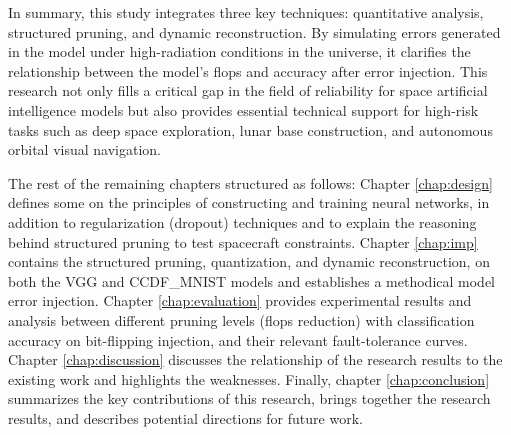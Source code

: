 In summary, this study integrates three key techniques: quantitative analysis, structured pruning, and dynamic reconstruction. By simulating errors generated in the model under high-radiation conditions in the universe, it clarifies the relationship between the model's \gls{flops} and accuracy after error injection. This research not only fills a critical gap in the field of reliability for space artificial intelligence models but also provides essential technical support for high-risk tasks such as deep space exploration, lunar base construction, and autonomous orbital visual navigation.

The rest of the remaining chapters structured as follows: Chapter \ref{chap:design} defines some on the principles of constructing and training neural networks, in addition to regularization (dropout) techniques and to explain the reasoning behind structured pruning to test spacecraft constraints. Chapter \ref{chap:imp} contains the structured pruning, quantization, and dynamic reconstruction, on both the VGG and CCDF\_MNIST models and establishes a methodical model error injection. Chapter \ref{chap:evaluation} provides experimental results and analysis between different pruning levels (\gls{flops} reduction) with classification accuracy on bit-flipping injection, and their relevant fault-tolerance curves. Chapter \ref{chap:discussion} discusses the relationship of the research results to the existing work and highlights the weaknesses. Finally, chapter \ref{chap:conclusion} summarizes the key contributions of this research, brings together the research results, and describes potential directions for future work.